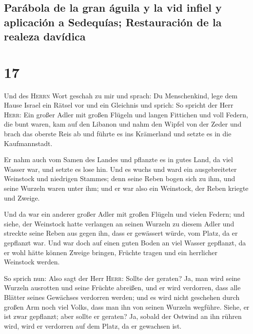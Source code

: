 \hypertarget{paruxe1bola-de-la-gran-uxe1guila-y-la-vid-infiel-y-aplicaciuxf3n-a-sedequuxedas-restauraciuxf3n-de-la-realeza-davuxeddica}{%
\subsection{Parábola de la gran águila y la vid infiel y aplicación a
Sedequías; Restauración de la realeza
davídica}\label{paruxe1bola-de-la-gran-uxe1guila-y-la-vid-infiel-y-aplicaciuxf3n-a-sedequuxedas-restauraciuxf3n-de-la-realeza-davuxeddica}}

\hypertarget{section-16}{%
\section{17}\label{section-16}}

 Und des \textsc{Herrn} Wort geschah zu mir und sprach:
 Du Menschenkind, lege dem Hause Israel ein Rätsel vor und
ein Gleichnis  und sprich: So spricht der Herr
\textsc{Herr}: Ein großer Adler mit großen Flügeln und langen Fittichen
und voll Federn, die bunt waren, kam auf den Libanon und nahm den Wipfel
von der Zeder  und brach das oberste Reis ab und führte es
ins Krämerland und setzte es in die Kaufmannstadt.

 Er nahm auch vom Samen des Landes und pflanzte es in
gutes Land, da viel Wasser war, und setzte es lose hin. 
Und es wuchs und ward ein ausgebreiteter Weinstock und niedrigen
Stammes; denn seine Reben bogen sich zu ihm, und seine Wurzeln waren
unter ihm; und er war also ein Weinstock, der Reben kriegte und Zweige.

 Und da war ein anderer großer Adler mit großen Flügeln
und vielen Federn; und siehe, der Weinstock hatte verlangen an seinen
Wurzeln zu diesem Adler und streckte seine Reben aus gegen ihn, dass er
gewässert würde, vom Platz, da er gepflanzt war.  Und war
doch auf einen guten Boden an viel Wasser gepflanzt, da er wohl hätte
können Zweige bringen, Früchte tragen und ein herrlicher Weinstock
werden.

 So sprich nun: Also sagt der Herr \textsc{Herr}: Sollte
der geraten? Ja, man wird seine Wurzeln ausrotten und seine Früchte
abreißen, und er wird verdorren, dass alle Blätter seines Gewächses
verdorren werden; und es wird nicht geschehen durch großen Arm noch viel
Volks, dass man ihn von seinen Wurzeln wegführe.  Siehe,
er ist zwar gepflanzt; aber sollte er geraten? Ja, sobald der Ostwind an
ihn rühren wird, wird er verdorren auf dem Platz, da er gewachsen ist.

